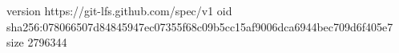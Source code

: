 version https://git-lfs.github.com/spec/v1
oid sha256:078066507d84845947ec07355f68c09b5cc15af9006dca6944bec709d6f405e7
size 2796344

